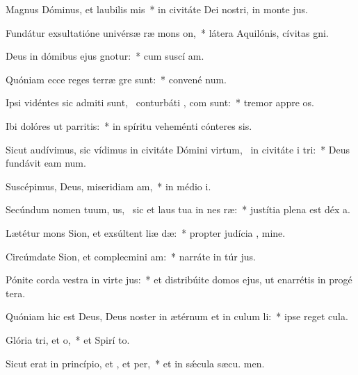 \item Magnus Dóminus, et laubilis mis~* in civitáte Dei nostri, in monte  jus.
\item Fundátur exsultatióne univérsæ ræ mons on,~* látera Aquilónis, cívitas  gni.
\item Deus in dómibus ejus gnotur:~* cum suscí am.
\item Quóniam ecce reges terræ gre sunt:~* convené  num.
\item Ipsi vidéntes sic admiti sunt,~\pscross{} conturbáti , com sunt:~* tremor appre os.
\item Ibi dolóres ut parritis:~* in spíritu veheménti cónteres  sis.
\item Sicut audívimus, sic vídimus in civitáte Dómini virtum,~\pscross{} in civitáte i tri:~* Deus fundávit eam  num.
\item Suscépimus, Deus, miseridiam am,~* in médio  i.
\item Secúndum nomen tuum, us,~\pscross{} sic et laus tua in nes ræ:~* justítia plena est déx a.
\item Lætétur mons Sion, et exsúltent liæ dæ:~* propter judícia , mine.
\item Circúmdate Sion, et complecmini am:~* narráte in túr jus.
\item Pónite corda vestra in virte jus:~* et distribúite domos ejus, ut enarrétis in progé tera.
\item Quóniam hic est Deus, Deus noster in ætérnum et in culum li:~* ipse reget   cula.
\item Glória tri, et o,~* et Spirí to.
\item Sicut erat in princípio, et , et per,~* et in sǽcula sæcu. men.
